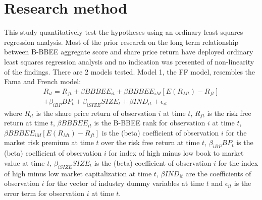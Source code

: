 \section{Research method}
This study quantitatively test the hypotheses using an ordinary least squares regression analysis. Most of the prior research on the long term relationship between B-BBEE aggregate score and share price return have deployed ordinary least squares regression analysis and no indication was presented of non-linearity of the findings. There are 2 models tested. Model 1, the FF model, resembles the Fama and French model:
\begin{equation}
\begin{aligned} %
    R_{it} = R_{ft} + \beta BBBEE_{it} + \beta BBBEE_{iM}[E(R_{Mt}) - R_{ft}] \\
    + \beta_{iBP} BP_t + \beta_{iSIZE} SIZE_t +  \beta IND_{it} + \epsilon_{it}
\end{aligned}
\end{equation}
where $R_{it}$ is the share price return of observation $i$ at time $t$, $R_{ft}$ is the risk free return at time $t$, $\beta BBBEE_{it}$ is the B-BBEE rank for observation $i$ at time $t$, $\beta BBBEE_{iM}[E(R_{Mt}) - R_{ft}]$ is the (beta) coefficient of observation $i$ for the market risk premium at time $t$ over the risk free return at time $t$, $\beta_{iBP} BP_t$ is the (beta) coefficient of observation $i$  for index of high minus low book to market value at time $t$, $\beta_{iSIZE} SIZE_t$ is the (beta) coefficient of observation $i$  for the index of high minus low market capitalization at time $t$, $\beta IND_{it}$ are the coefficients of observation $i$ for the vector of industry dummy variables at time $t$ and $\epsilon_{it}$ is the error term for observation $i$ at time $t$. 

